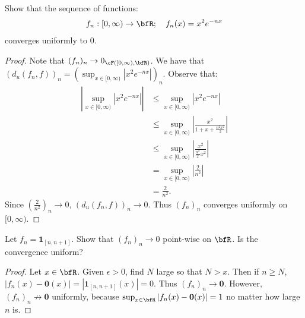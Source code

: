 \documentclass[10pt,twoside,openany]{memoir}
\begin{document}
    \begin{exercise}
        Show that the sequence of functions:
            \begin{equation*}
            \begin{split}
                f_n: [0,\infty) \rightarrow \bfR; \hspace{10pt}f_n(x)=x^2e^{-nx}
            \end{split}
            \end{equation*}
        converges uniformly to $0$.
    \end{exercise}
        \begin{proof}
            Note that $(f_n)_n \rightarrow 0_{\cF\left([0,\infty),\bfR\right)}$. We have that $(d_u(f_n,f))_n = \left(\sup_{x \in [0,\infty)} \left|x^2 e^{-nx}\right|\right)_n$. Observe that:
                \begin{equation*}
                \begin{split}
                    \left|\sup_{x \in [0,\infty)} \left|x^2 e^{-nx}\right|\right|
                    & \leq \sup_{x \in [0,\infty)} |x^2 e^{-nx}| \\
                    & \leq \sup_{x \in [0,\infty)} \left|\frac{x^2}{1+x+\frac{n^2x^2}{2}}\right| \\ 
                    & \leq \sup_{x \in [0,\infty)} \left|\frac{x^2}{\frac{n^2}{2} x^2}\right| \\
                    &= \sup_{x \in [0,\infty)} \left|\frac{2}{n^2}\right| \\
                    & = \frac{2}{n^2}.
                \end{split}
                \end{equation*}
            Since $\left(\frac{2}{n^2}\right)_n \rightarrow 0$, $(d_u(f_n,f))_n \rightarrow 0$. Thus $(f_n)_n$ converges uniformly on $[0,\infty)$.
        \end{proof}
    \begin{exercise}
        Let $f_n = \mathbf{1}_{[n,n+1]}$. Show that $(f_n)_n \rightarrow 0$ point-wise on $\bfR$. Is the convergence uniform?
    \end{exercise}
        \begin{proof}
            Let $x \in \bfR$. Given $\epsilon > 0$, find $N$ large so that $N > x$. Then if $n \geq N$, $|f_n(x) - \mathbf{0}(x)| = |\mathbf{1}_{[n,n+1]}(x)| = 0$. Thus $(f_n)_n \rightarrow \mathbf{0}$. However, $(f_n)_n \not\rightarrow \mathbf{0}$ uniformly, because $\sup_{x \in \bfR}|f_n(x) - \mathbf{0}(x)| = 1$ no matter how large $n$ is.
        \end{proof}
\end{document}
